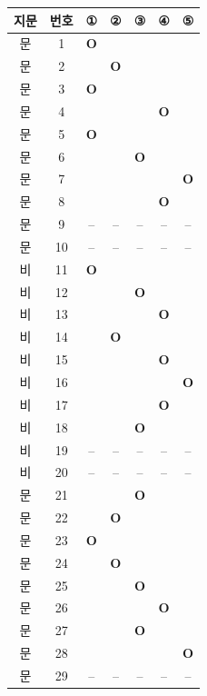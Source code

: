 \documentclass[11pt, a4paper]{article}
\begin{document}
\begin{tabularx}{\textwidth}{|c|c|c|c|c|c|c|}
\hline
\textbf{지문} & \textbf{번호} & ① & ② & ③ & ④ & ⑤ \\
\hline
[1]문 & 1 & \textbf{O} &  &  &  &  \\
\hline
[1]문 & 2 &  & \textbf{O} &  &  &  \\
\hline
[1]문 & 3 & \textbf{O} &  &  &  &  \\
\hline
[1]문 & 4 &  &  &  & \textbf{O} &  \\
\hline
[1]문 & 5 & \textbf{O} &  &  &  &  \\
\hline
[1]문 & 6 &  &  & \textbf{O} &  &  \\
\hline
[1]문 & 7 &  &  &  &  & \textbf{O} \\
\hline
[1]문 & 8 &  &  &  & \textbf{O} &  \\
\hline
[1]문 & 9 & -- & -- & -- & -- & -- \\
\hline
[1]문 & 10 & -- & -- & -- & -- & -- \\
\hline
[2]비 & 11 & \textbf{O} &  &  &  &  \\
\hline
[2]비 & 12 &  &  & \textbf{O} &  &  \\
\hline
[2]비 & 13 &  &  &  & \textbf{O} &  \\
\hline
[2]비 & 14 &  & \textbf{O} &  &  &  \\
\hline
[2]비 & 15 &  &  &  & \textbf{O} &  \\
\hline
[2]비 & 16 &  &  &  &  & \textbf{O} \\
\hline
[2]비 & 17 &  &  &  & \textbf{O} &  \\
\hline
[2]비 & 18 &  &  & \textbf{O} &  &  \\
\hline
[2]비 & 19 & -- & -- & -- & -- & -- \\
\hline
[2]비 & 20 & -- & -- & -- & -- & -- \\
\hline
[3]문 & 21 &  &  & \textbf{O} &  &  \\
\hline
[3]문 & 22 &  & \textbf{O} &  &  &  \\
\hline
[3]문 & 23 & \textbf{O} &  &  &  &  \\
\hline
[3]문 & 24 &  & \textbf{O} &  &  &  \\
\hline
[3]문 & 25 &  &  & \textbf{O} &  &  \\
\hline
[3]문 & 26 &  &  &  & \textbf{O} &  \\
\hline
[3]문 & 27 &  &  & \textbf{O} &  &  \\
\hline
[3]문 & 28 &  &  &  &  & \textbf{O} \\
\hline
[3]문 & 29 & -- & -- & -- & -- & -- \\

\end{tabularx}
\end{document}
